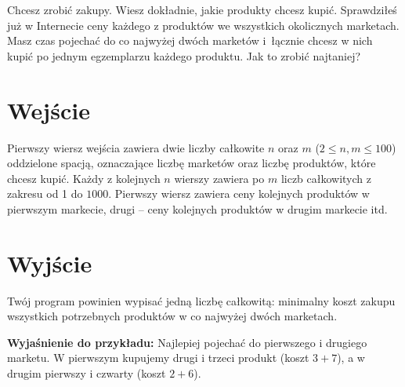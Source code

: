 \documentclass{spiral-kurs}
\begin{document}
\makeheader
%
     Chcesz zrobić zakupy.
     Wiesz dokładnie, jakie produkty chcesz kupić.
     Sprawdziłeś już w Internecie ceny każdego z produktów we wszystkich
     okolicznych marketach.
     Masz czas pojechać do co najwyżej dwóch marketów i~łącznie chcesz
     w nich kupić po jednym egzemplarzu każdego produktu.
     Jak to zrobić najtaniej?

    \section{Wejście}
      Pierwszy wiersz wejścia zawiera dwie liczby całkowite $n$ oraz $m$
      ($2\le n,m\le 100$) oddzielone spacją, oznaczające liczbę marketów
      oraz liczbę produktów, które chcesz kupić.
      Każdy z kolejnych $n$ wierszy zawiera po $m$ liczb całkowitych
      z zakresu od 1 do $1000$.
      Pierwszy wiersz zawiera ceny kolejnych produktów w pierwszym markecie,
      drugi -- ceny kolejnych produktów w drugim markecie itd.

    \section{Wyjście}
      Twój program powinien wypisać jedną liczbę całkowitą: minimalny koszt
      zakupu wszystkich potrzebnych produktów w co najwyżej dwóch marketach.


    \medskip
    \noindent
    \textbf{Wyjaśnienie do przykładu:}
    Najlepiej pojechać do pierwszego i drugiego marketu.
    W pierwszym kupujemy drugi i trzeci produkt (koszt $3+7$),
    a w drugim pierwszy i czwarty (koszt $2+6$).


  
\end{document}
